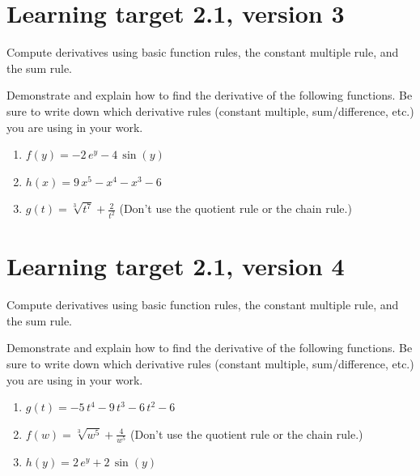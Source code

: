 \pagebreak

\section{Learning target 2.1, version 3}

Compute derivatives using basic function rules, the constant multiple rule, and the sum rule.

\hrulefill

Demonstrate and explain how to find the derivative of the following functions. Be sure to write down which derivative rules (constant multiple, sum/difference, etc.) you are using in your work.

\begin{enumerate}
    \item \(f(y) = -2 \, e^{y} - 4 \, \sin\left(y\right)\) 
    \vfill
    \item \(h(x) = 9 \, x^{5} - x^{4} - x^{3} - 6\) 
    \vfill
    \item \(g(t) = \sqrt[3]{t^7} + \frac{2}{t^{2}}\)  \quad (Don't use the quotient rule or the chain rule.)
    \vfill
\end{enumerate}

\pagebreak

\section{Learning target 2.1, version 4}

Compute derivatives using basic function rules, the constant multiple rule, and the sum rule.

\hrulefill

Demonstrate and explain how to find the derivative of the following functions. Be sure to write down which derivative rules (constant multiple, sum/difference, etc.) you are using in your work.

\begin{enumerate}
    \item \(g(t) = -5 \, t^{4} - 9 \, t^{3} - 6 \, t^{2} - 6\)
    \vfill
    \item \(f(w) = \sqrt[3]{w^5} + \frac{4}{w^{5}}\)  \quad (Don't use the quotient rule or the chain rule.)
    \vfill
    \item \(h(y) = 2 \, e^{y} + 2 \, \sin\left(y\right)\)
    \vfill
\end{enumerate}

\pagebreak

